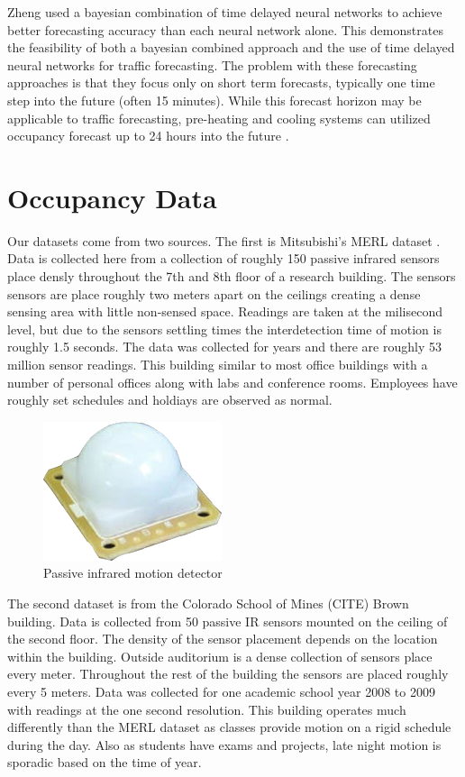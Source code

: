 \documentclass{acm_proc_article-sp}
\begin{document}
Zheng \cite{Zheng2006} used a bayesian combination of time delayed neural networks to achieve better forecasting accuracy than each neural network alone.  This demonstrates the feasibility of both a bayesian combined approach and the use of time delayed neural networks for traffic forecasting.  The problem with these forecasting approaches is that they focus only on short term forecasts, typically one time step into the future (often 15 minutes).  While this forecast horizon may be applicable to traffic forecasting, pre-heating and cooling systems can utilized occupancy forecast up to 24 hours into the future \cite{Ma2010}.  

\section{Occupancy Data}

Our datasets come from two sources.  The first is Mitsubishi's MERL dataset \cite{Wren2007}.  Data is collected here from a collection of roughly 150 passive infrared sensors place densly throughout the 7th and 8th floor of a research building.  The sensors sensors are place roughly two meters apart on the ceilings creating a dense sensing area with little non-sensed space.  Readings are taken at the milisecond level, but due to the sensors settling times the interdetection time of motion is roughly 1.5 seconds.  The data was collected for years and there are roughly 53 million sensor readings.  This building similar to most office buildings with a number of personal offices along with labs and conference rooms.  Employees have roughly set schedules and holdiays are observed as normal.

\begin{figure}[h]
\centering
\includegraphics[width = .4\linewidth]{pir_sensor.png}
\caption{Passive infrared motion detector}
\end{figure}

The second dataset is from the Colorado School of Mines (CITE) Brown building.  Data is collected from 50 passive IR sensors mounted on the ceiling of the second floor.  The density of the sensor placement depends on the location within the building.  Outside auditorium is a dense collection of sensors place every meter.  Throughout the rest of the building the sensors are placed roughly every 5 meters.  Data was collected for one academic school year 2008 to 2009 with readings at the one second resolution.  This building operates much differently than the MERL dataset as classes provide motion on a rigid schedule during the day.  Also as students have exams and projects, late night motion is sporadic based on the time of year.    
\end{document}
